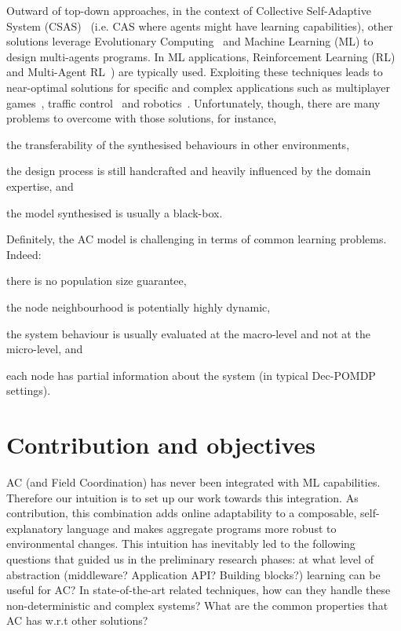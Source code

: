 \documentclass[conference]{IEEEtran}
\begin{document}
Outward of top-down approaches, in the context of Collective Self-Adaptive System (CSAS)~\cite{DBLP:conf/metacognition/Mitchell05} (i.e. CAS where agents might have learning capabilities), other solutions leverage Evolutionary Computing~\cite{DBLP:journals/swarm/BrambillaFBD13} and Machine Learning (ML) to design multi-agents programs. 
%
In ML applications, Reinforcement Learning (RL)~\cite{DBLP:journals/access/NaeemRC20} and Multi-Agent RL~\cite{DBLP:journals/tcyb/NguyenNN20}) are typically  used.
%
Exploiting these techniques leads to near-optimal solutions for specific and complex applications such as multiplayer games~\cite{DBLP:journals/nature/VinyalsBCMDCCPE19, DBLP:journals/taas/HaoLM15}, traffic control~\cite{DBLP:journals/aes/JinMK17, DBLP:conf/icac/SteinTRH16} and robotics~\cite{DBLP:journals/taas/KraemerB14}.
%
Unfortunately, though, there are many problems to overcome with those solutions, for instance,
\begin{enumerate*}[label=(\roman*)]
    \item the transferability of the synthesised behaviours in other environments, 
    \item the design process is still handcrafted and heavily influenced by the domain expertise, and
    \item the model synthesised is usually a black-box.
\end{enumerate*}

Definitely, the AC model is challenging in terms of common learning problems. Indeed:
\begin{enumerate*}[label=(\roman*)]
\item there is no population size guarantee,
\item the node neighbourhood is potentially highly dynamic,
\item the system behaviour is usually evaluated at the macro-level and not at the micro-level, and
\item each node has partial information about the system (in typical Dec-POMDP~\cite{DBLP:conf/uai/BernsteinZI00} settings).
\end{enumerate*}
\section{Contribution and objectives}
AC (and Field Coordination) has never been integrated with ML capabilities.
%
Therefore our intuition is to set up our work towards this integration.
%
As contribution, this combination adds online adaptability to a composable, self-explanatory language and makes aggregate programs more robust to environmental changes.
%
This intuition has inevitably led to the following questions that guided us in the preliminary research phases: 
at what level of abstraction (middleware? Application API? Building blocks?) learning can be useful for AC?
%
In state-of-the-art related techniques, how can they handle these non-deterministic and complex systems?
%
What are the common properties that AC has w.r.t other solutions?
\end{document}

